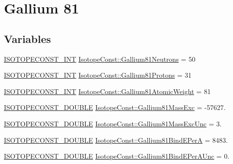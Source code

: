 \hypertarget{group___isotope_const-_gallium-_ga81}{}\section{Gallium 81}
\label{group___isotope_const-_gallium-_ga81}
\subsection*{Variables}
\begin{DoxyCompactItemize}
\item 
\mbox{\hyperlink{group___isotope_const-_macros_ga5f18360b3e99483a35c32d789e62621c}{I\+S\+O\+T\+O\+P\+E\+C\+O\+N\+S\+T\+\_\+\+I\+NT}} \mbox{\hyperlink{group___isotope_const-_gallium-_ga81_gad951720ebdf4c976bb3582502adef814}{Isotope\+Const\+::\+Gallium81\+Neutrons}} = 50
\item 
\mbox{\hyperlink{group___isotope_const-_macros_ga5f18360b3e99483a35c32d789e62621c}{I\+S\+O\+T\+O\+P\+E\+C\+O\+N\+S\+T\+\_\+\+I\+NT}} \mbox{\hyperlink{group___isotope_const-_gallium-_ga81_ga1a7f596ca2245479930e89337d3a39e8}{Isotope\+Const\+::\+Gallium81\+Protons}} = 31
\item 
\mbox{\hyperlink{group___isotope_const-_macros_ga5f18360b3e99483a35c32d789e62621c}{I\+S\+O\+T\+O\+P\+E\+C\+O\+N\+S\+T\+\_\+\+I\+NT}} \mbox{\hyperlink{group___isotope_const-_gallium-_ga81_ga0c818fa181ac93e2bf5d64a7c6d90453}{Isotope\+Const\+::\+Gallium81\+Atomic\+Weight}} = 81
\item 
\mbox{\hyperlink{group___isotope_const-_macros_ga8f45a7272ce02c0b4c65c44636ed719a}{I\+S\+O\+T\+O\+P\+E\+C\+O\+N\+S\+T\+\_\+\+D\+O\+U\+B\+LE}} \mbox{\hyperlink{group___isotope_const-_gallium-_ga81_gaeca910d5380dd0e46389cc42952ef403}{Isotope\+Const\+::\+Gallium81\+Mass\+Exc}} = -\/57627.
\item 
\mbox{\hyperlink{group___isotope_const-_macros_ga8f45a7272ce02c0b4c65c44636ed719a}{I\+S\+O\+T\+O\+P\+E\+C\+O\+N\+S\+T\+\_\+\+D\+O\+U\+B\+LE}} \mbox{\hyperlink{group___isotope_const-_gallium-_ga81_ga719c4f5d1e9c83369f01ae742659649a}{Isotope\+Const\+::\+Gallium81\+Mass\+Exc\+Unc}} = 3.
\item 
\mbox{\hyperlink{group___isotope_const-_macros_ga8f45a7272ce02c0b4c65c44636ed719a}{I\+S\+O\+T\+O\+P\+E\+C\+O\+N\+S\+T\+\_\+\+D\+O\+U\+B\+LE}} \mbox{\hyperlink{group___isotope_const-_gallium-_ga81_gab69fb0fd964a91ff8b02dea8e68110a1}{Isotope\+Const\+::\+Gallium81\+Bind\+E\+PerA}} = 8483.
\item 
\mbox{\hyperlink{group___isotope_const-_macros_ga8f45a7272ce02c0b4c65c44636ed719a}{I\+S\+O\+T\+O\+P\+E\+C\+O\+N\+S\+T\+\_\+\+D\+O\+U\+B\+LE}} \mbox{\hyperlink{group___isotope_const-_gallium-_ga81_ga87d5881f39990a68a96053b283e8654f}{Isotope\+Const\+::\+Gallium81\+Bind\+E\+Per\+A\+Unc}} = 0.

\end{DoxyCompactItemize}
